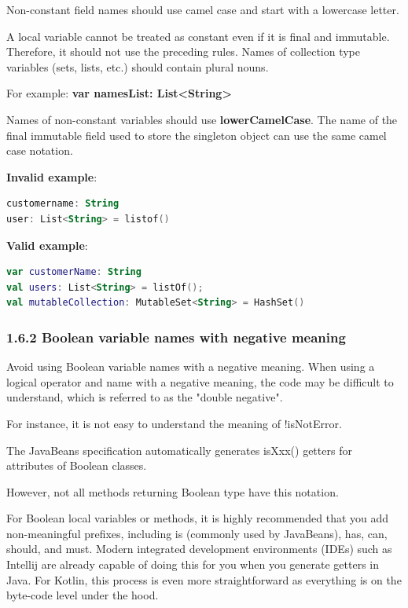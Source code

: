 {{{{\label{sec:1.6.1}

Non-constant field names should use camel case and start with a lowercase letter.

A local variable cannot be treated as constant even if it is final and immutable. Therefore, it should not use the preceding rules. Names of collection type variables (sets, lists, etc.) should contain plural nouns.

For example: \textbf{var namesList: List<String>}



Names of non-constant variables should use \textbf{lowerCamelCase}. The name of the final immutable field used to store the singleton object can use the same camel case notation.



\textbf{Invalid example}: 

\begin{lstlisting}[language=Kotlin]
customername: String
user: List<String> = listof()
\end{lstlisting}


\textbf{Valid example}: 

\begin{lstlisting}[language=Kotlin]
var customerName: String
val users: List<String> = listOf();
val mutableCollection: MutableSet<String> = HashSet()
\end{lstlisting}


\subsubsection*{\textbf{1.6.2 Boolean variable names with negative meaning}}
\leavevmode\newline

\label{sec:1.6.2}



Avoid using Boolean variable names with a negative meaning. When using a logical operator and name with a negative meaning, the code may be difficult to understand, which is referred to as the "double negative".

For instance, it is not easy to understand the meaning of !isNotError.

The JavaBeans specification automatically generates isXxx() getters for attributes of Boolean classes.

However, not all methods returning Boolean type have this notation.

For Boolean local variables or methods, it is highly recommended that you add non-meaningful prefixes, including is (commonly used by JavaBeans), has, can, should, and must. Modern integrated development environments (IDEs) such as Intellij are already capable of doing this for you when you generate getters in Java. For Kotlin, this process is even more straightforward as everything is on the byte-code level under the hood.



}}}}
